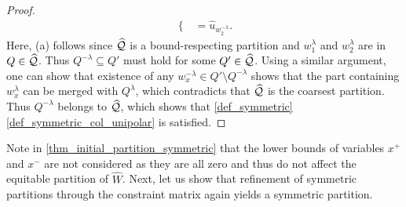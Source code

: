 \documentclass[pdflatex,sn-mathphys-num]{sn-jnl}%
\theoremstyle{thmstyleone}%
\theoremstyle{thmstylethree}%
\theoremstyle{thmstyletwo}%
\begin{document}
\begin{proof}
\begin{align*}
\begin{cases}
    \end{cases} = \widehat{u}_{w_2^{-\lambda}}.
\end{align*}
Here, \textup{(a)} follows since $\widehat{\mathcal{Q}}$ is a bound-respecting partition and $w_1^\lambda$ and $w_2^\lambda$ are in $Q\in \widehat{\mathcal{Q}}$. Thus $Q^{-\lambda}\subseteq Q'$ must hold for some $Q'\in \widehat{\mathcal{Q}}$. Using a similar argument, one can show that existence of any $w^{-\lambda}_x \in Q' \setminus Q^{-\lambda}$ shows that the part containing $w^{\lambda}_x$ can be merged with $Q^\lambda$, which contradicts that $\widehat{\mathcal{Q}}$ is the coarsest partition. Thus $Q^{-\lambda}$ belongs to $\widehat{\mathcal{Q}}$, which shows that \cref{def_symmetric}\ref{def_symmetric_col_unipolar} is satisfied. 
\end{proof}

Note in \cref{thm_initial_partition_symmetric} that the lower bounds of variables $x^+$ and $x^-$ are not considered as they are all zero and thus do not affect the equitable partition of $\widehat{W}$. Next, let us show that refinement of symmetric partitions through the constraint matrix again yields a symmetric partition.
\end{document}
